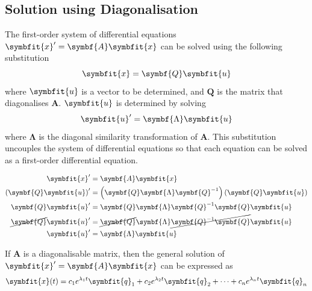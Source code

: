 \documentclass{article}
\begin{document}
\subsection{Solution using Diagonalisation}
\begin{theorem}
    The first-order system of differential equations
    \(\symbfit{x}' = \symbf{A} \symbfit{x}\) can be solved using the
    following substitution
    \begin{equation*}
        \symbfit{x}=\symbf{Q}\symbfit{u}
    \end{equation*}
    where \(\symbfit{u}\) is a vector to be determined, and
    \(\symbf{Q}\) is the matrix that diagonalises \(\symbf{A}\).
    \(\symbfit{u}\) is determined by solving
    \begin{equation*}
        \symbfit{u}' = \symbf{\Lambda} \symbfit{u}
    \end{equation*}
    where \(\symbf{\Lambda}\) is the diagonal similarity
    transformation of \(\symbf{A}\). This substitution uncouples the
    system of differential equations so that each equation can be solved
    as a first-order differential equation.
\end{theorem}
\begin{solutionF}[Proof]
    \begingroup
    \allowdisplaybreaks
    \begin{align*}
        \symbfit{x}'                           & = \symbf{A} \symbfit{x}                                                                           \\
        \left( \symbf{Q}\symbfit{u} \right)' & = \left( \symbf{Q}\symbf{\Lambda} \symbf{Q}^{-1} \right)\left( \symbf{Q}\symbfit{u} \right) \\
        \symbf{Q}\symbfit{u}'                & = \symbf{Q}\symbf{\Lambda} \symbf{Q}^{-1} \symbf{Q}\symbfit{u}                              \\
        \cancel{\symbf{Q}}\symbfit{u}'       & = \cancel{\symbf{Q}}\symbf{\Lambda} \cancel{\symbf{Q}^{-1} \symbf{Q}}\symbfit{u}            \\
        \symbfit{u}'                           & = \symbf{\Lambda} \symbfit{u}
    \end{align*}
    \endgroup
\end{solutionF}
\begin{theorem}
    If \(\symbf{A}\) is a diagonalisable matrix, then the general
    solution of \(\symbfit{x}' = \symbf{A} \symbfit{x}\) can be
    expressed as
    \begin{equation*}
        \symbfit{x}(t) = c_1 e^{\lambda_1 t} \symbfit{q}_1 + c_2 e^{\lambda_2 t} \symbfit{q}_2 + \cdots + c_n e^{\lambda_n t} \symbfit{q}_n
    \end{equation*}
\end{theorem}
\end{document}
